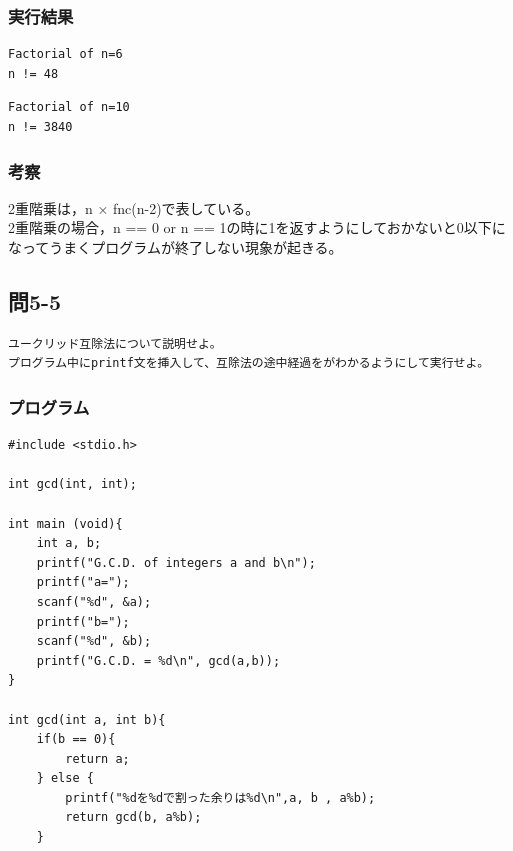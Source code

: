 \documentclass{jarticle}
\begin{document}
\subsubsection{実行結果\\}
\begin{breakbox}
\begin{verbatim}
Factorial of n=6
n != 48
\end{verbatim}
\end{breakbox}
\begin{breakbox}
\begin{verbatim}
Factorial of n=10
n != 3840
\end{verbatim}
\end{breakbox}
\subsubsection{考察\\}
2重階乗は，n × fnc(n-2)で表している。\\
2重階乗の場合，n == 0 or n == 1の時に1を返すようにしておかないと0以下になってうまくプログラムが終了しない現象が起きる。\\

\subsection{問5-5\\}
\begin{verbatim}
ユークリッド互除法について説明せよ。
プログラム中にprintf文を挿入して、互除法の途中経過をがわかるようにして実行せよ。
\end{verbatim}
\subsubsection{プログラム\\}
\begin{breakbox}
\begin{verbatim}
#include <stdio.h>

int gcd(int, int);

int main (void){
    int a, b;
    printf("G.C.D. of integers a and b\n");
    printf("a=");
    scanf("%d", &a);
    printf("b=");
    scanf("%d", &b);
    printf("G.C.D. = %d\n", gcd(a,b));
}

int gcd(int a, int b){
    if(b == 0){
        return a;
    } else {
        printf("%dを%dで割った余りは%d\n",a, b , a%b);
        return gcd(b, a%b);
    }

\end{verbatim}
\end{breakbox}
\end{document}
